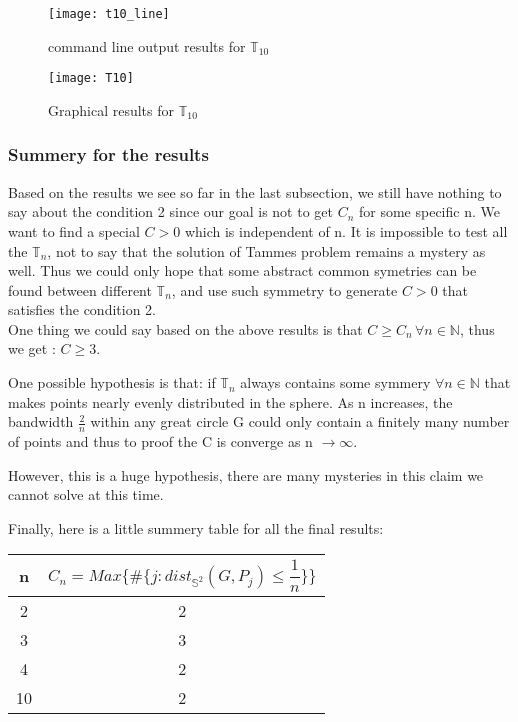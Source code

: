 \documentclass[12pt]{article}
\numberwithin{equation}{section}
\let\bb\mathbb
\let\bb\mathbb
\begin{document}
		\begin{figure}
			\centering
			\texttt{[image: t10\_line]}
			\caption{command line output results for $\bb{T}_{10}$ }
			\label{fig:c10}
		\end{figure}
		
		\begin{figure}
			\centering
			\texttt{[image: T10]}
			\caption{Graphical results for $\bb{T}_{10}$ }
			\label{fig:g10}
		\end{figure}
		
		\subsubsection{Summery for the results}
			Based on the results we see so far in the last subsection, we still have nothing to say about the condition 2 since our goal is not to get $C_n$ for some specific n. We want to find a special $C >0 $ which is independent of n. It is impossible to test all the $\bb{T}_n$, not to say that the solution of Tammes problem remains a mystery as well. Thus we could only hope that some abstract common symetries can be found between different $\bb{T}_n$, and use such symmetry to generate $C>0$ that satisfies the condition 2.\\
			One thing we could say based on the above results is that $C \geq C_n \, \forall n \in \bb{N}$, thus we get : $C \geq 3$. \par
			One possible hypothesis is that: if $\bb{T}_n$ always contains some symmery $\forall n \in \bb{N}$ that makes points nearly evenly distributed in the sphere. As n increases, the bandwidth $\frac{2}{n}$ within any great circle G  could only contain a finitely many number of points and thus to proof the C is converge as n $\rightarrow \infty$.\par 
			However, this is a huge hypothesis, there are many mysteries in this claim we cannot solve at this time.\par
			Finally, here is a little summery table for all the final results: \par 
			\vspace{5mm}
			\begin{tabular}{|c|c|}
				\hline
				n & $C_n = Max \{\#  \{ j:dist_{{\bb{S}}^2} (G, P_j)\leq \dfrac{1}{n} \}\}$ \\
				\hline 
				2 & 2 \\
				\hline 
				3 & 3 \\
				\hline 
				4 & 2 \\
				\hline 
				10 & 2 \\
				\hline
			\end{tabular}
			
\end{document}
